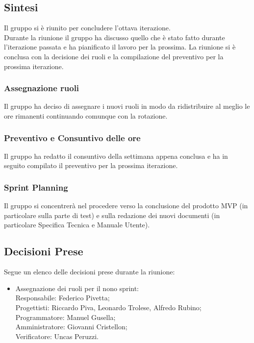\documentclass[10pt]{article}
\begin{document}
\subsection{Sintesi}
Il gruppo si è riunito per concludere l'ottava iterazione.\\
Durante la riunione il gruppo ha discusso quello che è stato fatto durante l'iterazione passata e ha pianificato il lavoro per la prossima. La riunione si è conclusa con la decisione dei ruoli e la compilazione del preventivo per la prossima iterazione.

\subsubsection{Assegnazione ruoli}
Il gruppo ha deciso di assegnare i nuovi ruoli in modo da ridistribuire al meglio le ore rimanenti continuando comunque con la rotazione.

\subsubsection{Preventivo e Consuntivo delle ore}
Il gruppo ha redatto il consuntivo della settimana appena conclusa e ha in seguito compilato il preventivo per la prossima iterazione.

\subsubsection{Sprint Planning}
Il gruppo si concentrerà nel procedere verso la conclusione del prodotto MVP (in particolare sulla parte di test) e sulla redazione dei nuovi documenti (in particolare Specifica Tecnica e Manuale Utente).

\subsection{Decisioni Prese}
Segue un elenco delle decisioni prese durante la riunione:
\begin{itemize}
    \item   Assegnazione dei ruoli per il nono sprint:\\
            Responsabile: Federico Pivetta;\\
            Progettisti: Riccardo Piva, Leonardo Trolese, Alfredo Rubino;\\
            Programmatore: Manuel Gusella;\\
            Amministratore: Giovanni Cristellon;\\
            Verificatore: Uncas Peruzzi.
\end{itemize}
\end{document}
